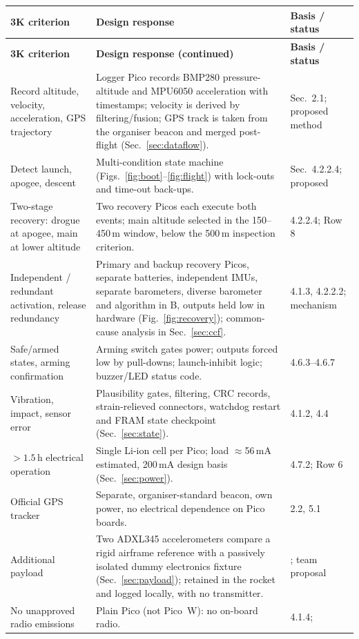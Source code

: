 \small
\begingroup
{}
\begin{longtable}{@{}L{34mm}L{70mm}L{46mm}@{}}
\toprule{}\textbf{3K criterion}&\textbf{Design response}&\textbf{Basis / status}\\\midrule\endfirsthead
\toprule{}\textbf{3K criterion}&\textbf{Design response (continued)}&\textbf{Basis / status}\\\midrule\endhead
\bottomrule\endlastfoot
Record altitude, velocity, acceleration, GPS trajectory & Logger Pico records BMP280 pressure-altitude and MPU6050 acceleration with timestamps; velocity is derived by filtering/fusion; GPS track is taken from the organiser beacon and merged post-flight (Sec.~\ref{sec:dataflow}). & \cite{rtc2027app03} Sec.~2.1; proposed method\\
Detect launch, apogee, descent & Multi-condition state machine (Figs.~\ref{fig:boot}--\ref{fig:flight}) with lock-outs and time-out back-ups. & \cite{rtc2027app03} Sec.~4.2.2.4; proposed\\
Two-stage recovery: drogue at apogee, main at lower altitude & Two recovery Picos each execute both events; main altitude selected in the 150--450\,m window, below the 500\,m inspection criterion. & \cite{rtc2027app03} 4.2.2.4; \cite{rtc2027app08} Row 8\\
Independent / redundant activation, release redundancy & Primary and backup recovery Picos, separate batteries, independent IMUs, separate barometers, diverse barometer and algorithm in B, outputs held low in hardware (Fig.~\ref{fig:recovery}); common-cause analysis in Sec.~\ref{sec:ccf}. & \cite{rtc2027app03} 4.1.3, 4.2.2.2; mechanism \\
Safe/armed states, arming confirmation & Arming switch gates power; outputs forced low by pull-downs; launch-inhibit logic; buzzer/LED status code. & \cite{rtc2027app03} 4.6.3--4.6.7\\
Vibration, impact, sensor error & Plausibility gates, filtering, CRC records, strain-relieved connectors, watchdog restart and FRAM state checkpoint (Sec.~\ref{sec:state}). & \cite{rtc2027app03} 4.1.2, 4.4\\
$>1.5$\,h electrical operation & Single Li-ion cell per Pico; load $\approx$56\,mA estimated, 200\,mA design basis (Sec.~\ref{sec:power}). & \cite{rtc2027app03} 4.7.2; \cite{rtc2027app08} Row 6\\
Official GPS tracker & Separate, organiser-standard beacon, own power, no electrical dependence on Pico boards. & \cite{rtc2027app03} 2.2, 5.1\\
Additional payload & Two ADXL345 accelerometers compare a rigid airframe reference with a passively isolated dummy electronics fixture (Sec.~\ref{sec:payload}); retained in the rocket and logged locally, with no transmitter. & \cite{tudsat2024frodo,rtc2027app03,adxl345ds}; team proposal\\
No unapproved radio emissions & Plain Pico (not Pico~W): no on-board radio. & \cite{rtc2027app03} 4.1.4; \cite{picods}\\
\end{longtable}
\endgroup %
\normalsize

